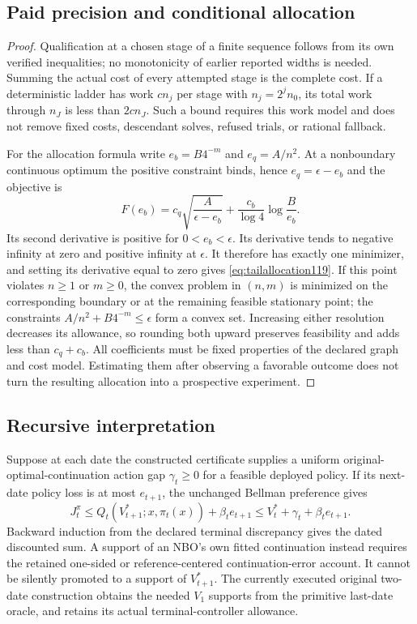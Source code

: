 \subsection{Paid precision and conditional allocation}
\begin{proof}
Qualification at a chosen stage of a finite sequence follows from its
own verified inequalities; no monotonicity of earlier reported widths
is needed.  Summing the actual cost of every attempted stage is the
complete cost.  If a deterministic ladder has work $cn_j$ per stage
with $n_j=2^jn_0$, its total work through $n_J$ is less than
$2cn_J$.  Such a bound requires this work model and does not remove
fixed costs, descendant solves, refused trials, or rational fallback.

For the allocation formula write $e_b=B4^{-m}$ and
$e_q=A/n^2$.  At a nonboundary continuous optimum the positive
constraint binds, hence $e_q=\epsilon-e_b$ and the objective is
\[
 F(e_b)=c_q\sqrt{\frac A{\epsilon-e_b}}
             +\frac{c_b}{\log4}\log\frac B{e_b}.
\]
Its second derivative is positive for $0<e_b<\epsilon$.
Its derivative tends to negative infinity at zero and positive
infinity at $\epsilon$.  It therefore has exactly one minimizer,
and setting its derivative equal to zero gives
\eqref{eq:tailallocation119}.  If this point violates $n\ge1$ or
$m\ge0$, the convex problem in $(n,m)$ is minimized on the
corresponding boundary or at the remaining feasible stationary point;
the constraints $A/n^2+B4^{-m}\le\epsilon$ form a convex set.
Increasing either resolution decreases its allowance, so rounding
both upward preserves feasibility and adds less than $c_q+c_b$.
All coefficients must be fixed properties of the declared graph and
cost model.  Estimating them after observing a favorable outcome does
not turn the resulting allocation into a prospective experiment.
\end{proof}

\subsection{Recursive interpretation}
Suppose at each date the constructed certificate supplies a uniform
original-optimal-continuation action gap $\gamma_t\ge0$ for a
feasible deployed policy.  If its next-date policy loss is at most
$e_{t+1}$, the unchanged Bellman preference gives
\[
 J_t^\pi\le Q_t(V_{t+1}^*;x,\pi_t(x))+\beta_te_{t+1}
          \le V_t^*+\gamma_t+\beta_te_{t+1}.
\]
Backward induction from the declared terminal discrepancy gives the
dated discounted sum.  A support of an NBO's own fitted continuation
instead requires the retained one-sided or reference-centered
continuation-error account.  It cannot be silently promoted to a
support of $V_{t+1}^*$.  The currently executed original two-date
construction obtains the needed $V_1$ supports from the primitive
last-date oracle, and retains its actual terminal-controller allowance.

